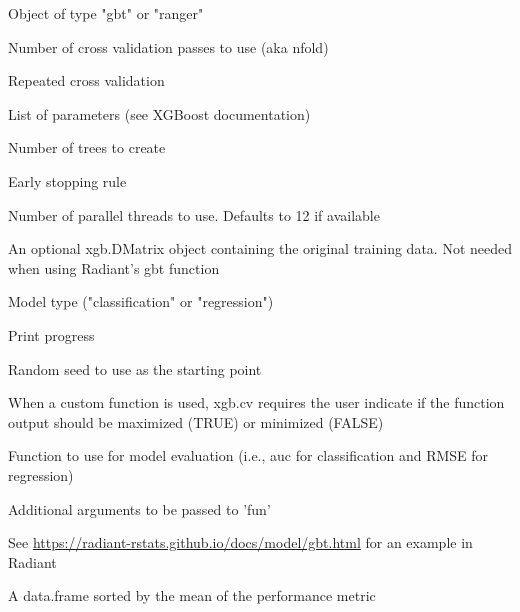 \documentclass[a4paper]{book}
\begin{document}
\begin{Arguments}
\begin{ldescription}
\item[\code{object}] Object of type "gbt" or "ranger"

\item[\code{K}] Number of cross validation passes to use (aka nfold)

\item[\code{repeats}] Repeated cross validation

\item[\code{params}] List of parameters (see XGBoost documentation)

\item[\code{nrounds}] Number of trees to create

\item[\code{early\_stopping\_rounds}] Early stopping rule

\item[\code{nthread}] Number of parallel threads to use. Defaults to 12 if available

\item[\code{train}] An optional xgb.DMatrix object containing the original training data. Not needed when using Radiant's gbt function

\item[\code{type}] Model type ("classification" or "regression")

\item[\code{trace}] Print progress

\item[\code{seed}] Random seed to use as the starting point

\item[\code{maximize}] When a custom function is used, xgb.cv requires the user indicate if the function output should be maximized (TRUE) or minimized (FALSE)

\item[\code{fun}] Function to use for model evaluation (i.e., auc for classification and RMSE for regression)

\item[\code{...}] Additional arguments to be passed to 'fun'
\end{ldescription}
\end{Arguments}
%
\begin{Details}
See \url{https://radiant-rstats.github.io/docs/model/gbt.html} for an example in Radiant
\end{Details}
%
\begin{Value}
A data.frame sorted by the mean of the performance metric
\end{Value}
\end{document}
